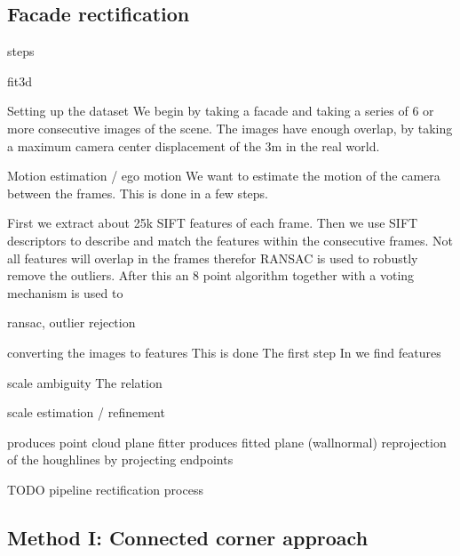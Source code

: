 





\subsection{Facade rectification}

steps

fit3d

	Setting up the dataset	
		We begin by taking a facade and taking a series of 6 or more consecutive images of the scene.
		The images have enough overlap, by taking a maximum camera center displacement of the 3m in the real world.

	Motion estimation / ego motion
		We want to estimate the motion of the camera between the frames.
		This is done in a few steps.

		First we extract about 25k SIFT features of each frame.
		Then we use SIFT descriptors to describe and match the features within the consecutive frames.
		Not all features will overlap in the frames therefor RANSAC is used to robustly remove the outliers.
		After this an 8 point algorithm together with a voting mechanism is used to 


		ransac, outlier rejection

		converting the images to features
		This is done 
		The first step
		In we find features

		scale ambiguity
	The relation 

	scale estimation / refinement 
		
		produces point cloud 
	plane fitter
		produces fitted plane (wallnormal)
	reprojection of the houghlines by projecting endpoints



TODO pipeline rectification process





\subsection{Method I: Connected corner approach} 
